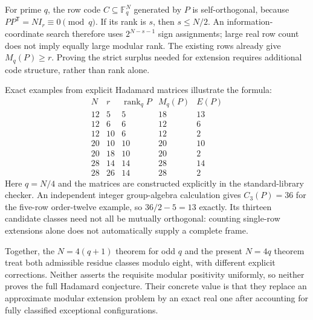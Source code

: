 For prime $q$, the row code $C\subseteq\mathbb F_q^N$ generated by
$P$ is self-orthogonal, because $PP^{\mathsf T}=NI_r\equiv0\pmod q$.
If its rank is $s$, then $s\le N/2$. An information-coordinate search
therefore uses $2^{N-s-1}$ sign assignments; large real row count
does not imply equally large modular rank. The existing rows already
give $M_q(P)\ge r$. Proving the strict surplus needed for extension
requires additional code structure, rather than rank alone.

Exact examples from explicit Hadamard matrices illustrate the formula:
\[
\begin{array}{c|r|r|r|r}
N&r&\operatorname{rank}_{q}P&M_q(P)&E(P)\\\hline
12&5&5&18&13\\
12&6&6&12&6\\
12&10&6&12&2\\
20&10&10&20&10\\
20&18&10&20&2\\
28&14&14&28&14\\
28&26&14&28&2
\end{array}
\]
Here $q=N/4$ and the matrices are constructed explicitly in the
standard-library checker. An independent integer group-algebra
calculation gives $C_3(P)=36$ for the five-row order-twelve example,
so $36/2-5=13$ exactly. Its thirteen candidate classes need not all
be mutually orthogonal: counting single-row extensions alone does
not automatically supply a complete frame.

Together, the $N=4(q+1)$ theorem for odd $q$ and the present
$N=4q$ theorem treat both admissible residue classes modulo eight,
with different explicit corrections. Neither asserts the requisite
modular positivity uniformly, so neither proves the full Hadamard
conjecture. Their concrete value is that they replace an approximate
modular extension problem by an exact real one after accounting for
fully classified exceptional configurations.

